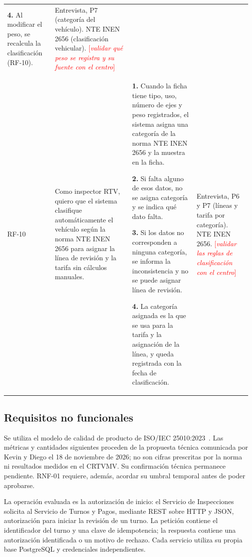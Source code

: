 \documentclass[11pt,a4paper]{article}
\newcommand{\pendiente}[1]{\textcolor{red}{[\textit{#1}]}}
\begin{document}
\begin{xltabular}{\textwidth}{lL{4.2cm}XL{2cm}}
  \textbf{4.} Al modificar el peso, se recalcula la clasificación (RF-10). &
  Entrevista, P7 (categoría del vehículo). NTE INEN 2656 (clasificación vehicular). \pendiente{validar qué peso se registra y su fuente con el centro} \\
  RF-10 & Como inspector RTV, quiero que el sistema clasifique automáticamente el vehículo según la norma NTE INEN 2656 para asignar la línea de revisión y la tarifa sin cálculos manuales. &
  \textbf{1.} Cuando la ficha tiene tipo, uso, número de ejes y peso registrados, el sistema asigna una categoría de la norma NTE INEN 2656 y la muestra en la ficha.\par
  \textbf{2.} Si falta alguno de esos datos, no se asigna categoría y se indica qué dato falta.\par
  \textbf{3.} Si los datos no corresponden a ninguna categoría, se informa la inconsistencia y no se puede asignar línea de revisión.\par
  \textbf{4.} La categoría asignada es la que se usa para la tarifa y la asignación de la línea, y queda registrada con la fecha de clasificación. &
  Entrevista, P6 y P7 (líneas y tarifa por categoría). NTE INEN 2656. \pendiente{validar las reglas de clasificación con el centro} \\
\end{xltabular}

\subsection{Requisitos no funcionales}
Se utiliza el modelo de calidad de producto de ISO/IEC 25010:2023~\cite{iso25010_2023}. Las métricas y cantidades siguientes proceden de la propuesta técnica comunicada por Kevin y Diego el 18 de noviembre de 2026; no son cifras prescritas por la norma ni resultados medidos en el CRTVMV. Su confirmación técnica permanece pendiente. RNF-01 requiere, además, acordar su umbral temporal antes de poder aprobarse.

La operación evaluada es la autorización de inicio: el Servicio de Inspecciones solicita al Servicio de Turnos y Pagos, mediante REST sobre HTTP y JSON, autorización para iniciar la revisión de un turno. La petición contiene el identificador del turno y una clave de idempotencia; la respuesta contiene una autorización identificada o un motivo de rechazo. Cada servicio utiliza su propia base PostgreSQL y credenciales independientes.
\end{document}
